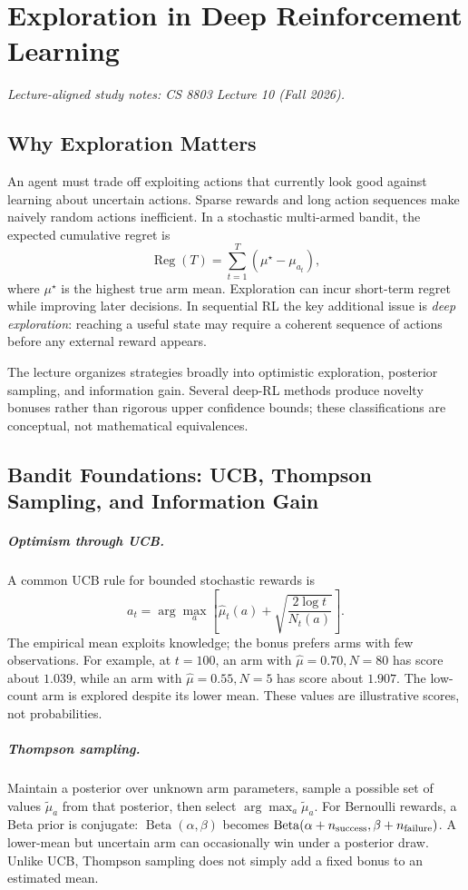 \chapter{Exploration in Deep Reinforcement Learning}
\label{ch:exploration}
\noindent\textit{Lecture-aligned study notes: CS 8803 Lecture 10 (Fall 2026).}

\section{Why Exploration Matters}
An agent must trade off exploiting actions that currently look good against learning about uncertain actions. Sparse rewards and long action sequences make naively random actions inefficient. In a stochastic multi-armed bandit, the expected cumulative regret is
\[
\operatorname{Reg}(T)=\sum_{t=1}^{T}(\mu^\star-\mu_{a_t}),
\]
where $\mu^\star$ is the highest true arm mean. Exploration can incur short-term regret while improving later decisions. In sequential RL the key additional issue is \emph{deep exploration}: reaching a useful state may require a coherent sequence of actions before any external reward appears.

The lecture organizes strategies broadly into optimistic exploration, posterior sampling, and information gain. Several deep-RL methods produce novelty bonuses rather than rigorous upper confidence bounds; these classifications are conceptual, not mathematical equivalences.

\section{Bandit Foundations: UCB, Thompson Sampling, and Information Gain}
\paragraph{Optimism through UCB.}
A common UCB rule for bounded stochastic rewards is
\[
a_t=\arg\max_a\left[\hat\mu_t(a)+\sqrt{\frac{2\log t}{N_t(a)}}\right].
\]
The empirical mean exploits knowledge; the bonus prefers arms with few observations. For example, at $t=100$, an arm with $\hat\mu=0.70,N=80$ has score about $1.039$, while an arm with $\hat\mu=0.55,N=5$ has score about $1.907$. The low-count arm is explored despite its lower mean. These values are illustrative scores, not probabilities.

\paragraph{Thompson sampling.}
Maintain a posterior over unknown arm parameters, sample a possible set of values $\tilde\mu_a$ from that posterior, then select $\arg\max_a\tilde\mu_a$. For Bernoulli rewards, a Beta prior is conjugate: $\operatorname{Beta}(\alpha,\beta)$ becomes $\operatorname{Beta}(\alpha+n_{\rm success},\beta+n_{\rm failure})$. A lower-mean but uncertain arm can occasionally win under a posterior draw. Unlike UCB, Thompson sampling does not simply add a fixed bonus to an estimated mean.

